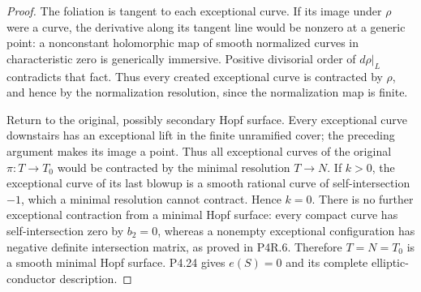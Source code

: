 \begin{proof}
The foliation is tangent to each exceptional curve.
If its image under $\rho$ were a curve, the derivative
along its tangent line would be nonzero at a generic
point: a nonconstant holomorphic map of smooth
normalized curves in characteristic zero is
generically immersive. Positive divisorial order
of $d\rho|_L$ contradicts that fact. Thus every
created exceptional curve is contracted by $\rho$,
and hence by the normalization resolution, since
the normalization map is finite.

Return to the original, possibly secondary Hopf
surface. Every exceptional curve downstairs has
an exceptional lift in the finite unramified cover;
the preceding argument makes its image a point.
Thus all exceptional curves of the original
$\pi:T\to T_0$ would be contracted by the minimal
resolution $T\to N$. If $k>0$, the exceptional curve
of its last blowup is a smooth rational curve of
self-intersection $-1$, which a minimal resolution
cannot contract. Hence $k=0$.
There is no further exceptional contraction from
a minimal Hopf surface: every compact curve has
self-intersection zero by $b_2=0$, whereas a
nonempty exceptional configuration has negative
definite intersection matrix, as proved in P4R.6.
Therefore $T=N=T_0$ is a smooth minimal Hopf
surface. P4.24 gives $e(S)=0$ and its complete
elliptic-conductor description.
\end{proof}
